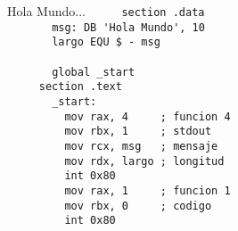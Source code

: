\documentclass[aspectratio=169]{beamer}
\begin{document}
\begin{frame}[fragile]{Hola Mundo...}
    \verb|     section .data                  |\\ 
    \verb|       msg: DB 'Hola Mundo', 10     | \A \\
    \verb|       largo EQU $ - msg            |\\
    \verb|                                    |\\
    \verb|       global _start                |\\
    \verb|     section .text                  |\\
    \verb|       _start:                      |\\
    \verb|         mov rax, 4     ; funcion 4 | \A \\
    \verb|         mov rbx, 1     ; stdout    | \A \\
    \verb|         mov rcx, msg   ; mensaje   | \A \\
    \verb|         mov rdx, largo ; longitud  | \A \\
    \verb|         int 0x80                   | \A \\
    \verb|         mov rax, 1     ; funcion 1 | \A \\
    \verb|         mov rbx, 0     ; codigo    | \A \\
    \verb|         int 0x80                   | \A \\
\end{frame}                          
\end{document}
